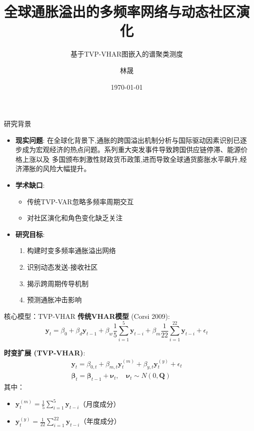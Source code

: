 \documentclass{beamer}
\title{全球通胀溢出的多频率网络与动态社区演化}
\subtitle{基于TVP-VHAR图嵌入的谱聚类测度}
\author{林晟}
\institute{统计学院}
\date{\today}
\begin{document}
\frame{\titlepage}

\begin{frame}{研究背景}
\begin{itemize}
\item \textbf{现实问题}: 在全球化背景下,通胀的跨国溢出机制分析与国际驱动因素识别已逐步成为宏观经济的热点问题。系列重大突发事件导致跨国供应链停滞、能源价格上涨以及 多国颁布刺激性财政货币政策,进而导致全球通货膨胀水平飙升,经济滞胀的风险大幅提升。
\item \textbf{学术缺口}: 
  \begin{itemize}
  \item 传统TVP-VAR忽略多频率周期交互
  \item 对社区演化和角色变化缺乏关注
  \end{itemize}
\item \textbf{研究目标}: 
  \begin{enumerate}
  \item 构建时变多频率通胀溢出网络
  \item 识别动态发送-接收社区
  \item 揭示跨周期传导机制
  \item 预测通胀冲击影响
  \end{enumerate}
\end{itemize}
\end{frame}


\begin{frame}{核心模型：TVP-VHAR}
\textbf{传统VHAR模型} (Corsi 2009):
\begin{equation*}
\boldsymbol{y}_t = \beta_0 + \beta_d \boldsymbol{y}_{t-1} + \beta_w \frac{1}{5}\sum_{i=1}^5 \boldsymbol{y}_{t-i} + \beta_m \frac{1}{22}\sum_{i=1}^{22} \boldsymbol{y}_{t-i} + \epsilon_t
\end{equation*}

\textbf{时变扩展 (TVP-VHAR)}:
\begin{gather*}
\boldsymbol{y}_t = \beta_{0,t}  + \beta_{m,t} \boldsymbol{y}_{t}^{(m)} + \beta_{y,t} \boldsymbol{y}_{t}^{(y)} + \epsilon_t \\
\boldsymbol{\beta}_t = \boldsymbol{\beta}_{t-1} + \boldsymbol{\nu}_t, \quad \boldsymbol{\nu}_t \sim N(0,\boldsymbol{Q})
\end{gather*}
其中：
\begin{itemize}
\item $\boldsymbol{y}_{t}^{(m)} = \frac{1}{5}\sum_{i=1}^5 \boldsymbol{y}_{t-i}$（月度成分）
\item $\boldsymbol{y}_{t}^{(y)} = \frac{1}{22}\sum_{i=1}^{22} \boldsymbol{y}_{t-i}$（年度成分）
\end{itemize}
\end{frame}
\end{document}
